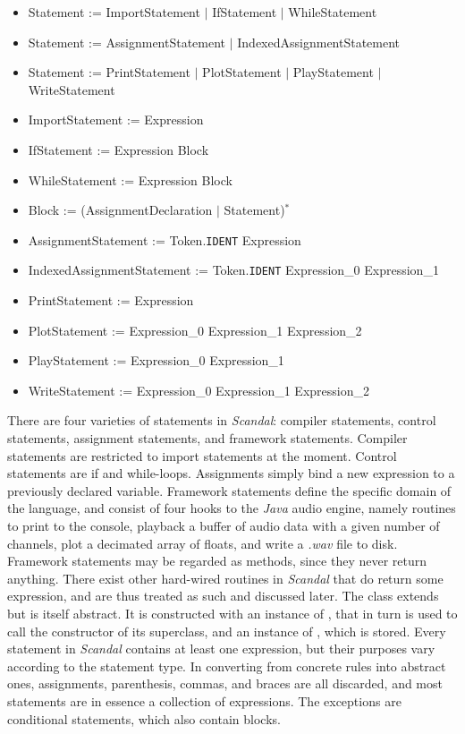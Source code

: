 \begin{itemize}
	\item Statement := ImportStatement $|$ IfStatement $|$ WhileStatement
	\item Statement := AssignmentStatement $|$ IndexedAssignmentStatement
	\item Statement := PrintStatement $|$ PlotStatement $|$ PlayStatement $|$ WriteStatement
	\item ImportStatement := Expression
	\item IfStatement := Expression Block
	\item WhileStatement := Expression Block
	\item Block := (AssignmentDeclaration $|$ Statement)$^*$
	\item AssignmentStatement := Token.\texttt{IDENT} Expression
	\item IndexedAssignmentStatement := Token.\texttt{IDENT} Expression\_0 Expression\_1
	\item PrintStatement := Expression
	\item PlotStatement := Expression\_0 Expression\_1 Expression\_2
	\item PlayStatement := Expression\_0 Expression\_1
	\item WriteStatement := Expression\_0 Expression\_1 Expression\_2
\end{itemize}

There are four varieties of statements in \emph{Scandal}: compiler statements, control statements, assignment statements, and framework statements. Compiler statements are restricted to import statements at the moment. Control statements are if and while-loops. Assignments simply bind a new expression to a previously declared variable. Framework statements define the specific domain of the language, and consist of four hooks to the \emph{Java} audio engine, namely routines to print to the console, playback a buffer of audio data with a given number of channels, plot a decimated array of floats, and write a \emph{.wav} file to disk. Framework statements may be regarded as  methods, since they never return anything. There exist other hard-wired routines in \emph{Scandal} that do return some expression, and are thus treated as such and discussed later. The  class extends  but is itself abstract. It is constructed with an instance of , that in turn is used to call the constructor of its superclass, and an instance of , which is stored. Every statement in \emph{Scandal} contains at least one expression, but their purposes vary according to the statement type. In converting from concrete rules into abstract ones, assignments, parenthesis, commas, and braces are all discarded, and most statements are in essence a collection of expressions. The exceptions are conditional statements, which also contain blocks.

